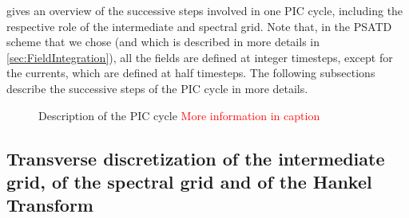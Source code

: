 \documentclass[a4paper]{article}   	%
\newcommand{\comment}[1]{\textcolor{red}{#1}}
\begin{document}
 gives an overview of the successive steps
involved in one PIC cycle, including the
respective role of the intermediate and spectral grid. Note that, in the PSATD
scheme that we chose (and which is described in more details in
\cref{sec:FieldIntegration}), all the fields are defined at integer
timesteps, except for the currents, which are defined at half
timesteps. The following subsections describe the successive steps of
the PIC cycle in more details.

\begin{figure}

\caption{Description of the PIC cycle \label{fig:GlobalScheme}
  \comment{More information in caption}}
\end{figure}


\subsection{Transverse discretization of the intermediate grid, of the spectral grid
  and of the Hankel Transform}
\label{sec:discretization}
\end{document}
